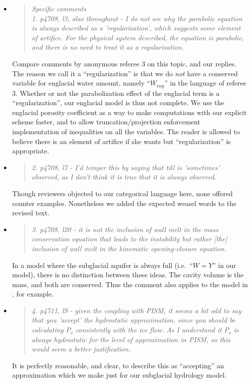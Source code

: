 \documentclass[11pt,reqno]{amsart}
\newcommand{\reply}[2]{
\medskip\medskip
\item  \begin{quote}
\emph{#1}
\end{quote}

\medskip
\noindent #2}
\begin{document}
\begin{itemize}
\reply{Specific comments\\
1. p4708, l3, also throughout - I do not see why the parabolic equation is always described as a 'regularization', which suggests some element of artifice.  For the physical system described, the equation is parabolic, and there is no need to treat it as a regularization.}
{Compare comments by anonymous referee 3 on this topic, and our replies.\\
\indent The reason we call it a ``regularization'' is that we do \emph{not} have a conserved variable for englacial water amount, namely ``$W_{eng}$'' in the language of referee 3.  Whether or not the parabolization effect of the englacial term is a ``regularization'', our englacial model is thus not complete.  We use the englacial porosity coefficient as a way to make computations with our explicit scheme faster, and to allow truncation/projection enforcement implementation of inequalities on all the variables.  The reader is allowed to believe there is an element of artifice if she wants but ``regularization'' is appropriate.}

\reply{2. p4708, l7 - I'd temper this by saying that till is 'sometimes' observed, as I don't think it is true that it is always observed.}
{Though reviewers objected to our categorical language here, none offered counter examples.  Nonetheless we added the expected weasel words to the revised text.}

\reply{3. p4708, l20 - it is not the inclusion of wall melt in the mass conservation equation that leads to the instability but rather [the] inclusion of wall melt in the kinematic opening-closure equation.}
{In a model where the subglacial aquifer is always full (i.e.~``$W=Y$'' in our model), there is no distinction between these ideas.  The cavity volume is the mass, and both are conserved.  Thus the comment also applies to the model in \cite{Werderetal2013}, for example.}

\reply{4. p4711, l9 - given the coupling with PISM, it seems a bit odd to say that you 'accept' the hydrostatic approximation, since you should be calculating $P_o$ consistently with the ice flow. As I understand it $P_o$ is always hydrostatic for the level of approximation in PISM, so this would seem a better justification.}
{It is perfectly reasonable, and clear, to describe this as ``accepting'' an approximation which we make just for our subglacial hydrology model.}


\end{itemize}
\end{document}
